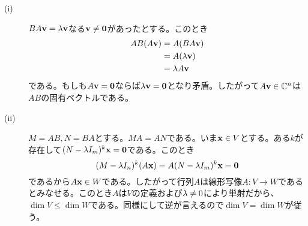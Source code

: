 \begin{sol} ${}$
  \begin{description}
    \item[(i)] $BA \textbf{v} = {\lambda} \textbf{v}$なる$\textbf{v} \neq \textbf{0}$があったとする。このとき
    \begin{align*}
      AB(A \textbf{v}) &= A(BA \textbf{v}) \\
      &= A ({\lambda} \textbf{v}) \\
      &= {\lambda} A \textbf{v}
    \end{align*}
    である。もしも$A \textbf{v} = \textbf{0}$ならば${\lambda} \textbf{v} = \textbf{0}$となり矛盾。したがって$A \textbf{v} \in {\mathbb C}^n$は$AB$の固有ベクトルである。
    \item[(ii)] $M = AB, N = BA$とする。$MA = AN$である。いま$\textbf{x} \in V$とする。ある$k$が存在して$(N - {\lambda} I_m)^k \textbf{x} = \textbf{0}$である。このとき
    \[
(M - {\lambda} I_n)^k (A \textbf{x}) = A  (N - {\lambda} I_m)^k \textbf{x} = \textbf{0}
    \]
    であるから$A \textbf{x} \in W$である。したがって行列$A$は線形写像$A \colon V \to W$であるとみなせる。このとき$A$は$V$の定義および${\lambda} \neq 0$により単射だから、$\dim V \leq \dim W$である。同様にして逆が言えるので$\dim V = \dim W$が従う。
  \end{description}
\end{sol}
